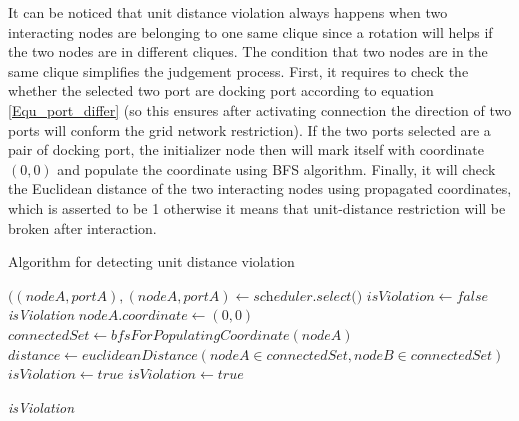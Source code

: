 \par\noindent
It can be noticed that unit distance violation always happens when two interacting nodes are belonging to one
same clique since a rotation will helps if the two nodes are in different cliques. The condition
that two nodes are in the same clique simplifies the judgement process. First, it requires to check the
whether the selected two port are docking port according to equation \ref{Equ_port_differ} (so this ensures after activating connection the
direction of two ports will conform the grid network restriction). If the two ports selected are a pair of
docking port, the initializer node then will mark itself with coordinate $(0,0)$ and populate the coordinate using
BFS algorithm. Finally, it will check the Euclidean distance of the two interacting nodes using propagated coordinates,
which is asserted to be 1 otherwise it means that unit-distance restriction will be broken after interaction.

\begin{algorithm}
\caption{Algorithm for detecting unit distance violation}\label{algo_dudv}
\begin{algorithmic}[1]

\State $((\textit{nodeA},\textit{portA}), (\textit{nodeA}, \textit{portA}) \gets \textit{scheduler.select()}$
\State $\textit{isViolation} \gets false$
 \Return \textit{isViolation} \EndIf
{}
    \State $ nodeA.coordinate \gets (0,0) $
    \State $ connectedSet \gets bfsForPopulatingCoordinate(nodeA) $
    \State $ distance \gets euclideanDistance(nodeA \in connectedSet, nodeB \in connectedSet)$
     \State $\textit{isViolation} \gets true$ \EndIf
\Else
    \State $\textit{isViolation} \gets true$
\EndIf

\Return \textit{isViolation}

\EndProcedure
\end{algorithmic}
\end{algorithm}


